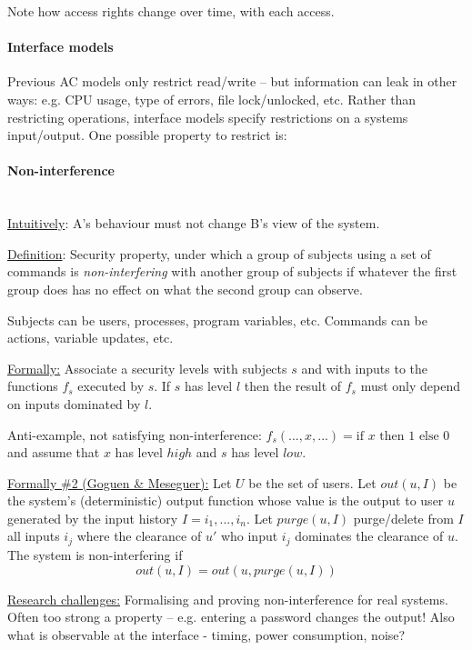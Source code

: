 Note how access rights change over time, with each access.

\paragraph{Interface models} Previous AC models only restrict read/write -- but information can leak in other ways: e.g. CPU usage, type of errors, file lock/unlocked, etc.
Rather than restricting operations, interface models specify restrictions on a systems input/output.
One possible property to restrict is:

\paragraph{Non-interference} \mbox{} \\
\underline{Intuitively}: A's behaviour must not change B's view of the system.

\underline{Definition}: Security property, under which a group of subjects using a set of commands is \emph{non-interfering} with another group of subjects if whatever the first group does has no effect on what the second group can observe.

Subjects can be users, processes, program variables, etc. Commands can be actions, variable updates, etc.

\underline{Formally:} Associate a security levels with subjects $s$ and with inputs to the functions $f_s$ executed by $s$. If $s$ has level $l$ then the result of $f_s$ must only depend on inputs dominated by $l$.

Anti-example, not satisfying non-interference: $f_s(..., x,...) = \text{if } x \text{ then 1 else 0}$ and assume that $x$ has level $high$ and $s$ has level $low$.

\underline{Formally \#2 (Goguen \& Meseguer):} Let $U$ be the set of users.
Let $out(u, I)$ be the system's (deterministic) output function whose value is the output to user $u$ generated by the input history $I=i_1, ..., i_n$.
Let $purge(u, I)$ purge/delete from $I$ all inputs $i_j$ where the clearance of $u'$ who input $i_j$ dominates the clearance of $u$.
The system is non-interfering if
$$ out(u, I) = out(u, purge(u,I)) $$

\underline{Research challenges:} Formalising and proving non-interference for real systems. Often too strong a property -- e.g. entering a password changes the output! Also what is observable at the interface - timing, power consumption, noise?


